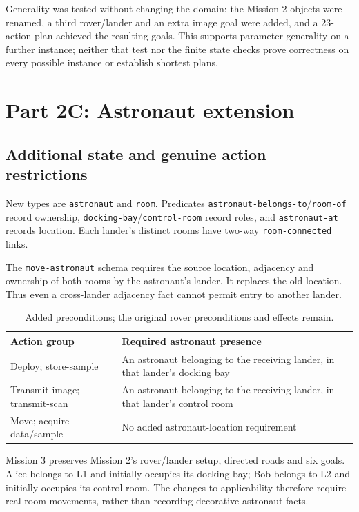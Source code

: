 \documentclass[11pt,a4paper]{article}
\begin{document}
Generality was tested without changing the domain: the Mission 2 objects were renamed, a third rover/lander and an extra image goal were added, and a 23-action plan achieved the resulting goals. This supports parameter generality on a further instance; neither that test nor the finite state checks prove correctness on every possible instance or establish shortest plans.

\clearpage
\section{Part 2C: Astronaut extension}
\subsection{Additional state and genuine action restrictions}
New types are \texttt{astronaut} and \texttt{room}. Predicates \texttt{astronaut-belongs-to}/\texttt{room-of} record ownership, \texttt{docking-bay}/\texttt{control-room} record roles, and \texttt{astronaut-at} records location. Each lander's distinct rooms have two-way \texttt{room-connected} links.

The \texttt{move-astronaut} schema requires the source location, adjacency and ownership of both rooms by the astronaut's lander. It replaces the old location. Thus even a cross-lander adjacency fact cannot permit entry to another lander.
\begin{table}[H]\centering
\caption{Added preconditions; the original rover preconditions and effects remain.}
\begin{tabularx}{\linewidth}{@{}p{.34\linewidth}Y@{}}
\toprule
\textbf{Action group} & \textbf{Required astronaut presence}\\
\midrule
Deploy; store-sample & An astronaut belonging to the receiving lander, in that lander's docking bay\\
Transmit-image; transmit-scan & An astronaut belonging to the receiving lander, in that lander's control room\\
Move; acquire data/sample & No added astronaut-location requirement\\
\bottomrule
\end{tabularx}
\end{table}
Mission 3 preserves Mission 2's rover/lander setup, directed roads and six goals. Alice belongs to L1 and initially occupies its docking bay; Bob belongs to L2 and initially occupies its control room. The changes to applicability therefore require real room movements, rather than recording decorative astronaut facts.
\end{document}
